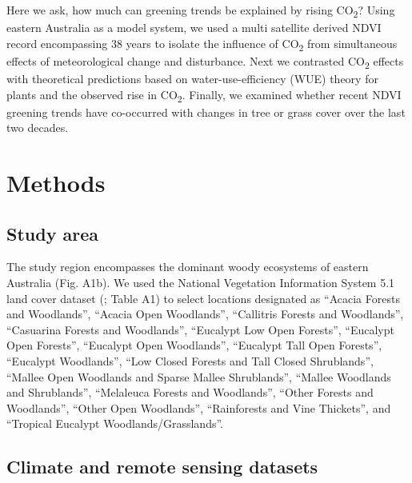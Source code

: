 \documentclass[gc, manuscript]{copernicus}
\begin{document}
Here we ask, how much can greening trends be explained by rising
CO\textsubscript{2}? Using eastern Australia as a model system, we used
a multi satellite derived NDVI record encompassing 38 years to isolate
the influence of CO\textsubscript{2} from simultaneous effects of
meteorological change and disturbance. Next we contrasted
CO\textsubscript{2} effects with theoretical predictions based on
water-use-efficiency (WUE) theory for plants and the observed rise in
CO\textsubscript{2}. Finally, we examined whether recent NDVI greening
trends have co-occurred with changes in tree or grass cover over the
last two decades.

\section{Methods}

\subsection{Study area}

The study region encompasses the dominant woody ecosystems of eastern
Australia (Fig. A1b). We used the National Vegetation Information System
5.1 land cover dataset (\citet{DepartmentAgricultureWater}; Table A1) to
select locations designated as ``Acacia Forests and Woodlands'',
``Acacia Open Woodlands'', ``Callitris Forests and Woodlands'',
``Casuarina Forests and Woodlands'', ``Eucalypt Low Open Forests'',
``Eucalypt Open Forests'', ``Eucalypt Open Woodlands'', ``Eucalypt Tall
Open Forests'', ``Eucalypt Woodlands'', ``Low Closed Forests and Tall
Closed Shrublands'', ``Mallee Open Woodlands and Sparse Mallee
Shrublands'', ``Mallee Woodlands and Shrublands'', ``Melaleuca Forests
and Woodlands'', ``Other Forests and Woodlands'', ``Other Open
Woodlands'', ``Rainforests and Vine Thickets'', and ``Tropical Eucalypt
Woodlands/Grasslands''.

\subsection{Climate and remote sensing datasets}
\end{document}
